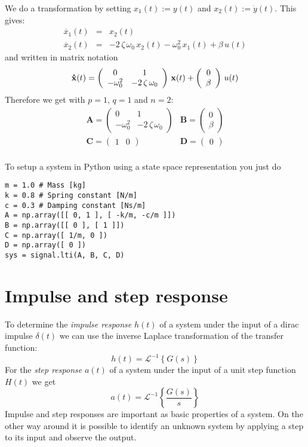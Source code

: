 \documentclass[a4paper,12pt]{article}
\renewcommand{\Vec}[1]{{\bf #1}}
\newcommand{\Mat}[1]{\mathbf{#1}}
\newcommand{\Section}[2]{\section{#2}\label{section:#1}}
\begin{document}
We do a transformation by setting $x_1(t):=y(t)$ and $x_2(t):=\dot{y}(t)$. This
gives:
\begin{eqnarray}
	\dot{x_1}(t)&=&x_2(t)\\
	\dot{x_2}(t)&=&-2\,\zeta\,\omega_0\,x_2(t)-\omega_0^2\,x_1(t)+\beta\,u(t)
\end{eqnarray}
and written in matrix notation
\begin{equation}
\Vec{\dot{x}}(t)=\left(\begin{array}{cc}0 & 1\\-\omega_0^2 & -2\,\zeta\,\omega_0\end{array}\right)\,\Vec{x}(t)+\left(\begin{array}{c}0\\\beta\end{array}\right)\,u(t)
\end{equation}
Therefore we get with $p=1$, $q=1$ and $n=2$:
\begin{equation}
\begin{array}{ll}
	\Mat{A}=\left(\begin{array}{cc}
		0 & 1\\
		-\omega_0^2 & -2\,\zeta\,\omega_0
	\end{array}\right) &
	\Mat{B}=\left(\begin{array}{c}
		0\\
		\beta
	\end{array}\right)\\[4ex]
	\Mat{C}=\left(\begin{array}{cc}
		1 & 0
	\end{array}\right) &
	\Mat{D}=\left(\begin{array}{c}
		0
	\end{array}\right)\\
\end{array}
\end{equation}

To setup a system in Python using a state space representation you just do
\begin{verbatim}
m = 1.0 # Mass [kg]
k = 0.8 # Spring constant [N/m]
c = 0.3 # Damping constant [Ns/m]
A = np.array([[ 0, 1 ], [ -k/m, -c/m ]])
B = np.array([[ 0 ], [ 1 ]])
C = np.array([ 1/m, 0 ])
D = np.array([ 0 ])
sys = signal.lti(A, B, C, D)
\end{verbatim}

\Section{pulsestep}{Impulse and step response}

To determine the {\em impulse response} $h(t)$ of a system under the input of a
dirac impulse $\delta(t)$ we can use the inverse Laplace transformation of the
transfer function:
\begin{equation}
h(t)=\mathcal{L}^{-1}\left\{G(s)\right\}
\end{equation}
For the {\em step response} $a(t)$ of a system under the input of a unit step
function $H(t)$ we get
\begin{equation}
a(t)=\mathcal{L}^{-1}\left\{\frac{G(s)}{s}\right\}
\end{equation}
Impulse and step responses are important as basic properties of a system. On
the other way around it is possible to identify an unknown system by applying
a step to its input and observe the output.\\
\end{document}
